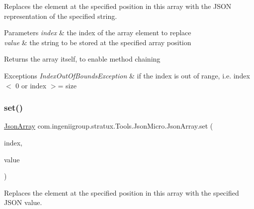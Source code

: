 Replaces the element at the specified position in this array with the J\+S\+ON representation of the specified string.


\begin{DoxyParams}{Parameters}
{\em index} & the index of the array element to replace \\
\hline
{\em value} & the string to be stored at the specified array position \\
\hline
\end{DoxyParams}
\begin{DoxyReturn}{Returns}
the array itself, to enable method chaining 
\end{DoxyReturn}

\begin{DoxyExceptions}{Exceptions}
{\em Index\+Out\+Of\+Bounds\+Exception} & if the index is out of range, i.\+e. {\ttfamily index $<$ 0} or {\ttfamily index $>$= size} \\
\hline
\end{DoxyExceptions}
\mbox{\label{classcom_1_1ingeniigroup_1_1stratux_1_1_tools_1_1_json_micro_1_1_json_array_acb29138e6ab908c5a1e7cefbf7f5679c}} 
\subsubsection{\texorpdfstring{set()}{set()}\hspace{0.1cm}{\footnotesize\ttfamily [7/7]}}
{\footnotesize\ttfamily \hyperlink{classcom_1_1ingeniigroup_1_1stratux_1_1_tools_1_1_json_micro_1_1_json_array}{Json\+Array} com.\+ingeniigroup.\+stratux.\+Tools.\+Json\+Micro.\+Json\+Array.\+set (\begin{DoxyParamCaption}\item[{int}]{index,  }\item[{\hyperlink{classcom_1_1ingeniigroup_1_1stratux_1_1_tools_1_1_json_micro_1_1_json_value}{Json\+Value}}]{value }\end{DoxyParamCaption})}

Replaces the element at the specified position in this array with the specified J\+S\+ON value.


